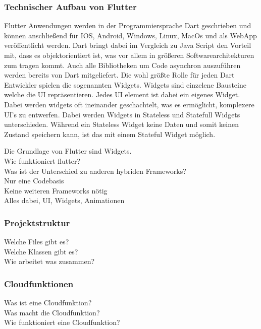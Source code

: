 \subsubsection{Technischer Aufbau von Flutter}
Flutter Anwendungen werden in der Programmiersprache Dart geschrieben und können anschließend für IOS, Android, Windows, Linux, MacOs und als WebApp veröffentlicht werden. Dart bringt dabei im Vergleich zu Java Script den Vorteil mit, dass es objektorientiert ist, was vor allem in größeren Softwarearchitekturen zum tragen kommt. Auch alle Bibliotheken um Code asynchron auszuführen werden bereits von Dart mitgeliefert. 
Die wohl größte Rolle für jeden Dart Entwickler spielen die sogenannten Widgets. Widgets sind einzelene Bausteine welche die UI repräsentieren. Jedes UI element ist dabei ein eigenes Widget. Dabei werden widgets oft ineinander geschachtelt, was es ermöglicht, komplexere UI’s zu entwerfen. Dabei werden Widgets in Stateless und Statefull Widgets unterschieden. Während ein Stateless Widget keine Daten und somit keinen Zustand speichern kann, ist das mit einem Stateful Widget möglich.

Die Grundlage von Flutter sind Widgets. \\
Wie funktioniert flutter?   \\
Was ist der Unterschied zu anderen hybriden Frameworks?  \\ 
Nur eine Codebasis \\
Keine weiteren Frameworks nötig\\
Alles dabei, UI, Widgets, Animationen\\

\subsubsection{Projektstruktur}
Welche Files gibt es? \\
Welche Klassen gibt es? \\
Wie arbeitet was zusammen? \\

\subsubsection{Cloudfunktionen}
Was ist eine Cloudfunktion? \\
Was macht die Cloudfunktion? \\
Wie funktioniert eine Cloudfunktion? \\

